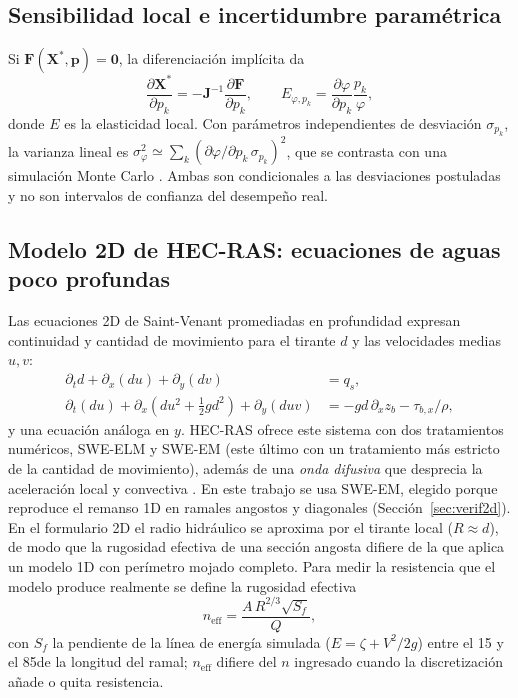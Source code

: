 \subsection{Sensibilidad local e incertidumbre paramétrica}
Si $\mathbf F(\mathbf X^\ast,\mathbf p)=\mathbf 0$, la diferenciación implícita da
\begin{equation}
\frac{\partial\mathbf X^\ast}{\partial p_k}=-\mathbf J^{-1}\frac{\partial\mathbf F}{\partial p_k},\qquad
E_{\varphi,p_k}=\frac{\partial\varphi}{\partial p_k}\frac{p_k}{\varphi},
\label{eq:elast}
\end{equation}
donde $E$ es la elasticidad local. Con parámetros independientes de desviación $\sigma_{p_k}$, la varianza lineal es $\sigma_\varphi^2\simeq\sum_k(\partial\varphi/\partial p_k\,\sigma_{p_k})^2$, que se contrasta con una simulación Monte Carlo \citep{saltelli2008}. Ambas son condicionales a las desviaciones postuladas y no son intervalos de confianza del desempeño real.

\subsection{Modelo 2D de HEC-RAS: ecuaciones de aguas poco profundas}\label{sec:dw}
Las ecuaciones 2D de Saint-Venant promediadas en profundidad expresan continuidad y cantidad de movimiento para el tirante $d$ y las velocidades medias $u,v$:
\begin{align}
\partial_t d+\partial_x(du)+\partial_y(dv)&=q_s,\nonumber\\
\partial_t(du)+\partial_x\!\left(du^2+\tfrac12gd^2\right)+\partial_y(duv)&=-gd\,\partial_xz_b-\tau_{b,x}/\rho,
\label{eq:swe}
\end{align}
y una ecuación análoga en $y$. HEC-RAS ofrece este sistema con dos tratamientos numéricos, SWE-ELM y SWE-EM (este último con un tratamiento más estricto de la cantidad de movimiento), además de una \emph{onda difusiva} que desprecia la aceleración local y convectiva \citep{hecmomentum,hecmanual}. En este trabajo se usa SWE-EM, elegido porque reproduce el remanso 1D en ramales angostos y diagonales (Sección~\ref{sec:verif2d}). En el formulario 2D el radio hidráulico se aproxima por el tirante local ($R\approx d$), de modo que la rugosidad efectiva de una sección angosta difiere de la que aplica un modelo 1D con perímetro mojado completo. Para medir la resistencia que el modelo produce realmente se define la rugosidad efectiva
\begin{equation}
n_\mathrm{eff}=\frac{A\,R^{2/3}\sqrt{S_f}}{Q},
\label{eq:neff}
\end{equation}
con $S_f$ la pendiente de la línea de energía simulada ($E=\zeta+V^2/2g$) entre el 15 y el 85\pc de la longitud del ramal; $n_\mathrm{eff}$ difiere del $n$ ingresado cuando la discretización añade o quita resistencia.

